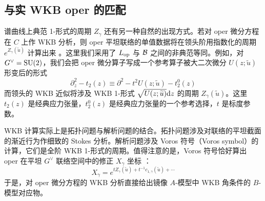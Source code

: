 \subsection{与实 WKB oper 的匹配}
谱曲线上典范 1-形式的周期 $Z_\gamma$ 还有另一种自然的出现方式。若对 oper 微分方程在 $C$ 上作 WKB 分析，则 oper 平坦联络的单值数据将在领头阶用指数化的周期 $e^{Z_\gamma(\tilde u)}$ 计算出来 \cite{Voros1,Voros2,Voros3,Voros4,Gaiotto:2014bza}。这里我们采用了 $L_{{\mathrm{op}}}$ 与 ${{\mathcal B}}$ 之间的非典范等同。例如，对 $G^\vee = {\mathrm{SU}}(2)$，我们会把 oper 微分算子写成一个参考算子被大二次微分 $U(z;\tilde u)$ 形变后的形式
\begin{equation}
\partial^2_z - t_2(z) \equiv \partial^2 - t^2 U(z;\tilde u)- t_2^{0}(z) 
\end{equation}
而领头的 WKB 近似将涉及 WKB 1-形式 $\sqrt{U(z;\widetilde u)} {\mathrm d} z$ 的周期 $Z_\gamma(\tilde u)$。这里 $t_2(z)$ 是经典应力张量，$t_2^0(z)$ 是经典应力张量的一个参考选择，$t$ 是标度参数。

WKB 计算实际上是拓扑问题与解析问题的结合。拓扑问题涉及对联络的平坦截面的渐近行为作细致的 Stokes 分析。解析问题涉及 Voros 符号（Voros symbol）的计算，它们是全阶 WKB 1-形式的周期。值得注意的是，Voros 符号恰好算出 oper 在平坦 $G^\vee$ 联络空间中的修正 $X_\gamma$ 坐标 \cite{Gaiotto:2014bza}：
\begin{equation}
X_\gamma = e^{t Z_\gamma(\tilde u) + t^{-1} c_{1,\gamma}(\tilde u)  + \cdots}
\end{equation}
于是，对 oper 微分方程的 WKB 分析直接给出镜像 $A$-模型中 WKB 角条件的 $B$-模型对应物。 

